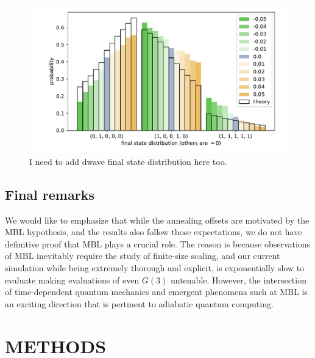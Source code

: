 \documentclass[prd,twocolumn,tightenlines,preprintnumbers,showpacs,superscriptaddress,notitlepage,nofootinbib,eqsecnum,floatfix,longbibliography,aps,10pt]{revtex4-2}
\begin{document}
\begin{figure}
	\centering
	\includegraphics[width=\columnwidth]{./new_figures/final_state_distribution.pdf}
	\caption{{\color{red}I need to add dwave final state distribution here too.}}
	\label{fig:final_state_distribution}
\end{figure}




\subsection{Final remarks}
\label{sec:results:final}
We would like to emphasize that while the annealing offsets are motivated by the MBL hypothesis, and the results also follow those expectations, we do not have definitive proof that MBL plays a crucial role.
The reason is because observations of MBL inevitably require the study of finite-size scaling, and our current simulation while being extremely thorough and explicit, is exponentially slow to evaluate making evaluations of even $G(3)$ untenable.
However, the intersection of time-dependent quantum mechanics and emergent phenomena such at MBL is an exciting direction that is pertinent to adiabatic quantum computing.






\section{METHODS}
\label{sec:methods}
\end{document}
